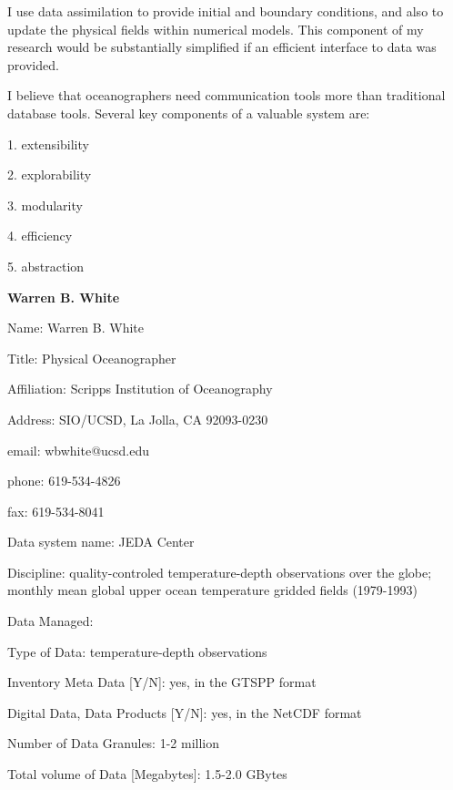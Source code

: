 	I use data assimilation to provide initial and boundary conditions, 
and also to update the physical fields within numerical models.  This 
component of my research would be substantially simplified if an 
efficient interface to data was provided.

	I believe that oceanographers need communication tools more than 
traditional database tools. Several key components of a valuable system 
are:
\begin{description}
	\item {1.} extensibility
	\item {2.} explorability
	\item {3.} modularity
	\item {4.} efficiency 
	\item {5.} abstraction
\end{description}
\newpage

\begin{center}
\LARGE
{\bf  Warren B. White}
\end{center}
\large
{}
\normalsize
\smallskip
\begin{description}
\item{Name:}  Warren B. White
\item{Title:}  Physical Oceanographer
\item{Affiliation:}  Scripps Institution of Oceanography
\item{Address:}  SIO/UCSD, La Jolla, CA 92093-0230
\item{email:}  wbwhite@ucsd.edu
\item{phone:}  619-534-4826
\item{fax:}  619-534-8041
\end{description}
\medskip
\large
{}
\normalsize
\medskip
\begin{description}

\item{Data system name:}  JEDA Center
\item{Discipline:}  quality-controled temperature-depth observations over 
the globe; monthly mean global upper ocean temperature gridded fields 
(1979-1993) 
\item{Data Managed:}
	\begin{description}
	\item{Type of Data:}  temperature-depth observations
	\item{Inventory Meta Data [Y/N]:}  yes, in the GTSPP format
	\item{Digital Data, Data Products [Y/N]:}  yes, in the NetCDF format
	\item{Number of Data Granules:}  1-2 million
	\item{Total volume of Data [Megabytes]:}  1.5-2.0 GBytes
	\end{description}
\end{description}

